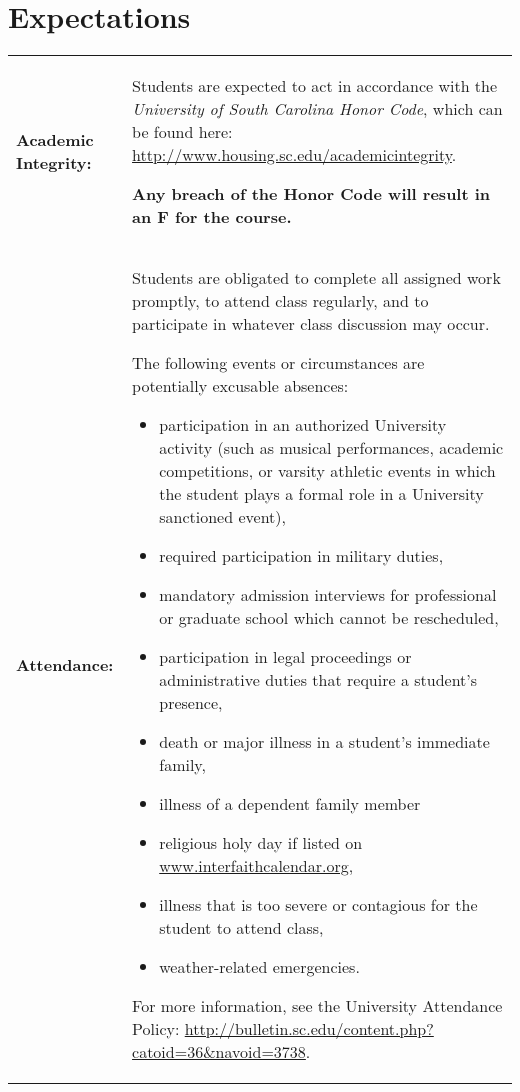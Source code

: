 \documentclass[10pt]{amsart}
\begin{document}
\section*{Expectations}
\noindent
\begin{tabular}{p{1.4in}p{5in}}
  {\bf Academic Integrity:} & Students are expected to act in accordance with the {\it University of South Carolina Honor Code}, 
  which can be found here: \url{http://www.housing.sc.edu/academicintegrity}.
  
  {\bf Any breach of the Honor Code will result in an F for the course.}\\
  {\bf Attendance:} & Students are obligated to complete all assigned work promptly, to attend class regularly, and to participate in whatever class discussion may occur.

  The following events or circumstances are potentially excusable absences:
  \begin{itemize}
  \item
    participation in an authorized University activity (such as musical performances, academic competitions, or varsity athletic events in which the student plays a formal role in a University sanctioned event),
  \item
    required participation in military duties,
  \item
    mandatory admission interviews for professional or graduate school which cannot be rescheduled,
  \item
    participation in legal proceedings or administrative duties that require a student's presence,
  \item
    death or major illness in a student’s immediate family,
  \item
    illness of a dependent family member
  \item
    religious holy day if listed on \url{www.interfaithcalendar.org},
  \item
    illness that is too severe or contagious for the student to attend class,
  \item
    weather-related emergencies.
  \end{itemize}
  For more information, see the University Attendance Policy: \url{http://bulletin.sc.edu/content.php?catoid=36\&navoid=3738}.
\end{tabular}
\end{document}
